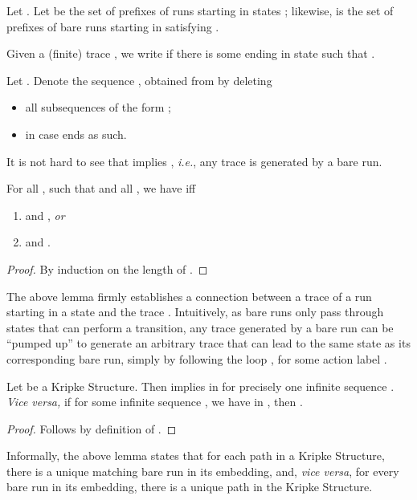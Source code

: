 \documentclass{llncs}
\newcommand{\ie}{\emph{i.e.}}
\begin{document}
Let .  Let  be the set of prefixes of runs starting in states ;
likewise,  is the set of prefixes of bare runs
starting in  satisfying .

Given a (finite) trace , we write
 if there is some 
ending in state  such that .

\begin{definition} Let .
Denote the sequence , obtained from 
by deleting
\begin{itemize}
\item all subsequences of the form ;
\item  in case  ends
as such.
\end{itemize}
\end{definition}
It is not hard to see that 
implies , \ie,
any trace  is generated by a bare run.
\begin{lemma}
\label{lem:bare_vs_ordinary}
For all ,  such that
 and all , we have
 iff
\begin{enumerate}
\item
 and
, \emph{or}

\item  and
.

\end{enumerate}

\end{lemma}
\begin{proof} By induction on the length of .
\end{proof}
The above lemma firmly establishes a connection between a trace 
of a run starting in a state  and the trace . Intuitively,
as bare runs only pass through states that can perform a 
transition, any trace generated by a bare run can be ``pumped up'' to generate
an arbitrary trace that can lead to the same state as its corresponding
bare run, simply by following the loop , for some action label .

\begin{lemma}
\label{lem:bareruns1}
Let  be a Kripke Structure.
Then
 implies
 in 
for precisely one
infinite sequence . \emph{Vice versa,}
if for some infinite sequence , we have
 in ,
then .
\end{lemma}
\begin{proof}
Follows by definition of .
\end{proof}
Informally, the above lemma states that for each path in a Kripke
Structure, there is a unique matching bare run in its \LTS embedding,
and, \emph{vice versa}, for every bare run in its \LTS embedding, there
is a unique path in the Kripke Structure.
\end{document}
